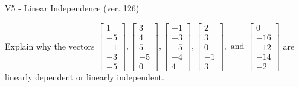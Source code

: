 \begin{exercise}
  \begin{exerciseTitle}V5 - Linear Independence (ver. 126)\end{exerciseTitle}
  \begin{exerciseStatement}
    Explain why the vectors \(\left[\begin{array}{r}
1 \\
-5 \\
-1 \\
-3 \\
-5
\end{array}\right] , \left[\begin{array}{r}
3 \\
4 \\
5 \\
-5 \\
0
\end{array}\right] , \left[\begin{array}{r}
-1 \\
-3 \\
-5 \\
-4 \\
4
\end{array}\right] , \left[\begin{array}{r}
2 \\
3 \\
0 \\
-1 \\
3
\end{array}\right] , \text{ and } \left[\begin{array}{r}
0 \\
-16 \\
-12 \\
-14 \\
-2
\end{array}\right]\) are linearly dependent or linearly independent.	



\end{exerciseStatement}
\end{exercise}
